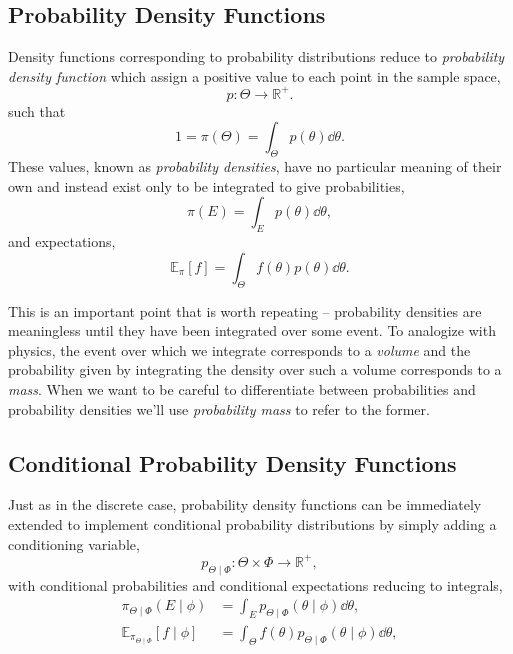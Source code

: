 \subsection{Probability Density Functions}

Density functions corresponding to probability distributions reduce
to \emph{probability density function} which assign a positive value 
to each point in the sample space,
%
\begin{equation*}
p : \Theta \rightarrow \mathbb{R}^{+}.
\end{equation*}
such that
%
\begin{equation*}
1 = \pi \! \left( \Theta \right) = \int_{\Theta} p \! \left( \theta \right) \dd \theta.
\end{equation*}
%
These values, known as \emph{probability densities}, have no particular 
meaning of their own and instead exist only to be integrated to give 
probabilities,
%
\begin{equation*}
\pi \! \left( E \right)
=
\int_{E} p \! \left( \theta \right) \dd \theta,
\end{equation*}
%
and expectations,
%
\begin{equation*}
\mathbb{E}_{\pi} \! \left[ f \right]
=
\int_{\Theta} f \! \left( \theta \right) p \! \left( \theta \right) \dd \theta.
\end{equation*}

This is an important point that is worth repeating -- probability densities 
are meaningless until they have been integrated over some event.  To 
analogize with physics, the event over which we integrate corresponds 
to a \emph{volume} and the probability given by integrating the density 
over such a volume corresponds to a \emph{mass}.  When we want to 
be careful to differentiate between probabilities and probability densities 
we'll use \emph{probability mass} to refer to the former.

\subsection{Conditional Probability Density Functions}

Just as in the discrete case, probability density functions can be 
immediately extended to implement conditional probability distributions 
by simply adding a conditioning variable,
%
\begin{equation*}
p_{\Theta \mid \Phi} : \Theta \times \Phi \rightarrow \mathbb{R}^{+},
\end{equation*}
%
with conditional probabilities and conditional expectations reducing
to integrals,
%
\begin{align*}
\pi_{\Theta \mid \Phi}  \! \left( E \mid \phi \right)
&=
\int_{E} p_{\Theta \mid \Phi}  \! \left( \theta \mid \phi \right) \dd \theta,
\\
\mathbb{E}_{\pi_{\Theta \mid \Phi} } \! \left[ f \mid \phi \right]
&=
\int_{\Theta} f \! \left( \theta \right) 
p_{\Theta \mid \Phi}  \! \left( \theta \mid \phi \right) \dd \theta,
\end{align*}

